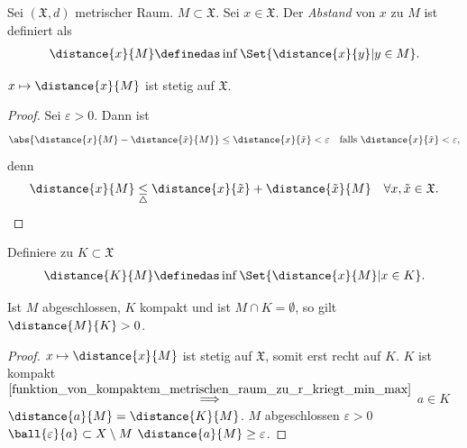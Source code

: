 \begin{beispiel*}
    Sei \( (\mathfrak{X},d)\) metrischer Raum. \( M\subset \mathfrak{X}\). Sei \( x\in \mathfrak{X}\). Der \emph{Abstand} von \( x\) zu \( M\) ist definiert als
    \begin{align*}
        \distance{x}{M}\definedas \inf\Set{\distance{x}{y}|y\in M}.
    \end{align*} 
    \begin{behauptung*}
        \( x\mapsto \distance{x}{M}\) ist stetig auf \( \mathfrak{X}\). 
    \end{behauptung*}
    \begin{proof}
        Sei \( \varepsilon>0\). Dann ist
        \begin{align*}
            \abs{\distance{x}{M}-\distance{\tilde{x}}{M}}\leq \distance{x}{\tilde{x}}<\varepsilon \quad \text{falls }\distance{x}{\tilde{x}}<\varepsilon, 
        \end{align*}
        denn
        \begin{align*}
            \distance{x}{M}\underset{\triangle}{\leq}\distance{x}{\tilde{x}}+\distance{\tilde{x}}{M}\quad \forall x,\tilde{x}\in \mathfrak{X}.
        \end{align*}
        
    \end{proof}
    Definiere zu \( K\subset \mathfrak{X} \)
    \begin{align*}
        \distance{K}{M}\definedas \inf\Set{\distance{x}{M}|x\in K}.
    \end{align*}
    \begin{behauptung*}
        Ist \( M \) abgeschlossen, \( K \) kompakt und ist \( M\cap K=\emptyset \), so gilt \( \distance{M}{K}>0 \).
    \end{behauptung*}
    \begin{proof}
        \( x\mapsto \distance{x}{M} \) ist stetig auf \( \mathfrak{X} \), somit erst recht auf \( K \). \( K \) ist kompakt \( \overset{\ref{funktion_von_kompaktem_metrischen_raum_zu_r_kriegt_min_max}}{\implies} \) \texists \( a\in K \) \sd \( \distance{a}{M}=\distance{K}{M} \). \( M \) abgeschlossen \timplies \texists \( \varepsilon>0 \) \sd \( \ball{\varepsilon}{a}\subset X\setminus M \) \timplies \( \distance{a}{M}\geq \varepsilon \).
        

\end{proof}
\end{beispiel*}
